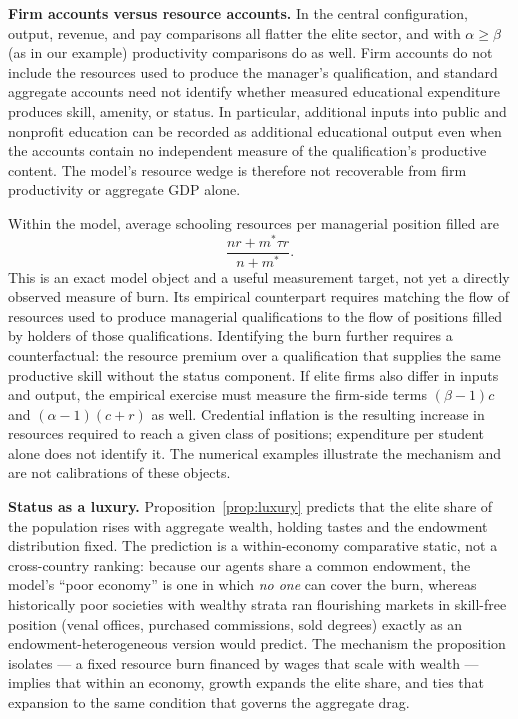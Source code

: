 \documentclass[12pt,letterpaper]{article}
\theoremstyle{definition}
\begin{document}
\textbf{Firm accounts versus resource accounts.}
In the central configuration, output, revenue, and pay comparisons all flatter the elite sector, and with $\alpha\geq\beta$ (as in our example) productivity comparisons do as well.
Firm accounts do not include the resources used to produce the manager's qualification, and standard aggregate accounts need not identify whether measured educational expenditure produces skill, amenity, or status.
In particular, additional inputs into public and nonprofit education can be recorded as additional educational output even when the accounts contain no independent measure of the qualification's productive content.
The model's resource wedge is therefore not recoverable from firm productivity or aggregate GDP alone.

Within the model, average schooling resources per managerial position filled are
\[
\frac{nr+m^\ast\tau r}{n+m^\ast}.
\]
This is an exact model object and a useful measurement target, not yet a directly observed measure of burn.
Its empirical counterpart requires matching the flow of resources used to produce managerial qualifications to the flow of positions filled by holders of those qualifications.
Identifying the burn further requires a counterfactual: the resource premium over a qualification that supplies the same productive skill without the status component.
If elite firms also differ in inputs and output, the empirical exercise must measure the firm-side terms $(\beta-1)c$ and $(\alpha-1)(c+r)$ as well.
Credential inflation is the resulting increase in resources required to reach a given class of positions; expenditure per student alone does not identify it.
The numerical examples illustrate the mechanism and are not calibrations of these objects.

\textbf{Status as a luxury.}
Proposition~\ref{prop:luxury} predicts that the elite share of the population rises with aggregate wealth, holding tastes and the endowment distribution fixed.
The prediction is a within-economy comparative static, not a cross-country ranking: because our agents share a common endowment, the model's ``poor economy'' is one in which \emph{no one} can cover the burn, whereas historically poor societies with wealthy strata ran flourishing markets in skill-free position (venal offices, purchased commissions, sold degrees) exactly as an endowment-heterogeneous version would predict.
The mechanism the proposition isolates --- a fixed resource burn financed by wages that scale with wealth --- implies that within an economy, growth expands the elite share, and ties that expansion to the same condition that governs the aggregate drag.
\end{document}
